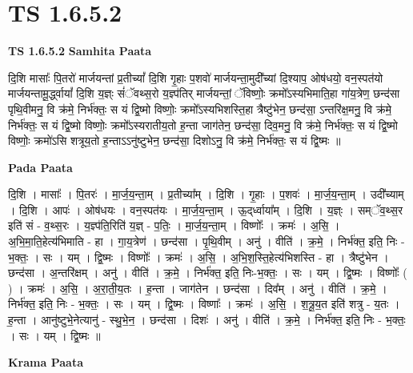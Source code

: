 \documentclass[17pt]{extarticle}
\begin{document}
\section{ TS 1.6.5.2 }

\textbf{TS 1.6.5.2 } \newline
\textbf{Samhita Paata} \newline

दि॒शि मासाः᳚ पि॒तरो॑ मार्जयन्तां प्र॒तीच्यां᳚ दि॒शि गृ॒हाः प॒शवो॑ मार्जयन्ता॒मुदी᳚च्यां दि॒श्याप॒ ओष॑धयो॒ वन॒स्पत॑यो मार्जयन्तामू॒र्द्ध्वायां᳚ दि॒शि य॒ज्ञ्ः सं॑ॅवथ्स॒रो य॒ज्ञ्प॑तिर् मार्जयन्तां॒ ॅविष्णोः॒ क्रमो᳚ऽस्यभिमाति॒हा गा॑य॒त्रेण॒ छन्द॑सा पृथि॒वीमनु॒ वि क्र॑मे॒ निर्भ॑क्तः॒ स यं द्वि॒ष्मो विष्णोः॒ क्रमो᳚ऽस्यभिशस्ति॒हा त्रैष्टु॑भेन॒ छन्द॑सा॒ ऽन्तरि॑क्ष॒मनु॒ वि क्र॑मे॒ निर्भ॑क्तः॒ स यं द्वि॒ष्मो विष्णोः॒ क्रमो᳚ऽस्यरातीय॒तो ह॒न्ता जाग॑तेन॒ छन्द॑सा॒ दिव॒मनु॒ वि क्र॑मे॒ निर्भ॑क्तः॒ स यं द्वि॒ष्मो विष्णोः॒ क्रमो॑ऽसि शत्रूय॒तो ह॒न्ताऽऽनु॑ष्टुभेन॒ छन्द॑सा॒ दिशोऽनु॒ वि क्र॑मे॒ निर्भ॑क्तः॒ स यं द्वि॒ष्मः ॥ \newline

\textbf{Pada Paata} \newline

दि॒शि । मासाः᳚ । पि॒तरः॑ । मा॒र्ज॒य॒न्ता॒म् । प्र॒तीच्या᳚म् । दि॒शि । गृ॒हाः । प॒शवः॑ । मा॒र्ज॒य॒न्ता॒म् । उदी᳚च्याम् । दि॒शि । आपः॑ । ओष॑धयः । वन॒स्पत॑यः । मा॒र्ज॒य॒न्ता॒म् । ऊ॒द्‌र्ध्वाया᳚म् । दि॒शि । य॒ज्ञ्ः । सम्ॅव॒थ्स॒र इति॑ सं - व॒थ्स॒रः । य॒ज्ञ्प॑ति॒रिति॑ य॒ज्ञ् - प॒तिः॒ । मा॒र्ज॒य॒न्ता॒म् । विष्णोः᳚ । क्रमः॑ । अ॒सि॒ । अ॒भि॒मा॒ति॒हेत्य॑भिमाति - हा । गा॒य॒त्रेण॑ । छन्द॑सा । पृ॒थि॒वीम् । अनु॑ । वीति॑ । क्र॒मे॒ । निर्भ॑क्त॒ इति॒ निः - भ॒क्तः॒ । सः । यम् । द्वि॒ष्मः । विष्णोः᳚ । क्रमः॑ । अ॒सि॒ । अ॒भि॒श॒स्ति॒हेत्य॑भिशस्ति - हा । त्रैष्टु॑भेन । छन्द॑सा । अ॒न्तरि॑क्षम् । अनु॑ । वीति॑ । क्र॒मे॒ । निर्भ॑क्त॒ इति॒ निः-भ॒क्तः॒ । सः । यम् । द्वि॒ष्मः । विष्णोः᳚ ( ) । क्रमः॑ । अ॒सि॒ । अ॒रा॒ती॒य॒तः । ह॒न्ता । जाग॑तेन । छन्द॑सा । दिव᳚म् । अनु॑ । वीति॑ । क्र॒मे॒ । निर्भ॑क्त॒ इति॒ निः - भ॒क्तः॒ । सः । यम् । द्वि॒ष्मः । विष्णाः᳚ । क्रमः॑ । अ॒सि॒ । श॒त्रू॒य॒त इति॑ शत्रु - य॒तः । ह॒न्ता । आनु॑ष्टुभे॒नेत्यानु॑ - स्थु॒भे॒न॒ । छन्द॑सा । दिशः॑ । अनु॑ । वीति॑ । क्र॒मे॒ । निर्भ॑क्त॒ इति॒ निः - भ॒क्तः॒ । सः । यम् । द्वि॒ष्मः ॥  \newline


\textbf{Krama Paata} \newline
\end{document}
